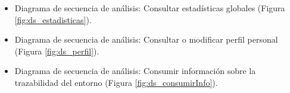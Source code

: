 \documentclass[12pt,a4paper, twoside]{report}
\begin{document}
\begin{itemize}
		
		\newpage
		
		\item Diagrama de secuencia de análisis: Consultar estadísticas globales (Figura \ref{fig:ds_estadisticas}).
		
		
		\newpage
		
		\item Diagrama de secuencia de análisis: Consultar o modificar perfil personal (Figura \ref{fig:ds_perfil}).
		
		
		\newpage
		
		\item Diagrama de secuencia de análisis: Consumir información sobre la trazabilidad del entorno (Figura \ref{fig:ds_consumirInfo}).
		
		
	\end{itemize}
 				
\end{document}
